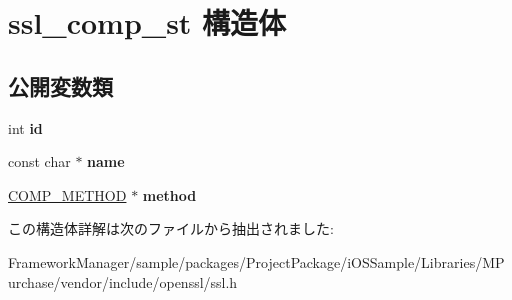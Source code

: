 \hypertarget{structssl__comp__st}{}\section{ssl\+\_\+comp\+\_\+st 構造体}
\label{structssl__comp__st}
\subsection*{公開変数類}
\begin{DoxyCompactItemize}
\item 
\hypertarget{structssl__comp__st_aa0289c534fa9807fd873d0586c5e49aa}{}int {\bfseries id}\label{structssl__comp__st_aa0289c534fa9807fd873d0586c5e49aa}

\item 
\hypertarget{structssl__comp__st_a5f5f77d06eefedaaa25bab3779a37c7b}{}const char $\ast$ {\bfseries name}\label{structssl__comp__st_a5f5f77d06eefedaaa25bab3779a37c7b}

\item 
\hypertarget{structssl__comp__st_a0db9c4890962ace222be72135c08b26c}{}\hyperlink{structcomp__method__st}{C\+O\+M\+P\+\_\+\+M\+E\+T\+H\+O\+D} $\ast$ {\bfseries method}\label{structssl__comp__st_a0db9c4890962ace222be72135c08b26c}

\end{DoxyCompactItemize}


この構造体詳解は次のファイルから抽出されました\+:\begin{DoxyCompactItemize}
\item 
Framework\+Manager/sample/packages/\+Project\+Package/i\+O\+S\+Sample/\+Libraries/\+M\+Purchase/vendor/include/openssl/ssl.\+h\end{DoxyCompactItemize}
